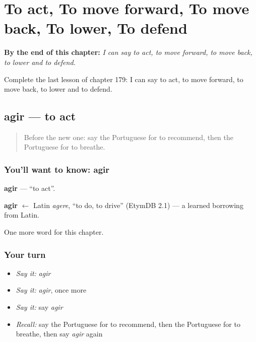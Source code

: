 
\chapter{To act, To move forward, To move back, To lower, To defend}
\label{ch:pt-to-act-to-move-forward-to-move-back-to-lower-to-defend}

\begin{chapteropening}
\textbf{By the end of this chapter:} \emph{I can say to act, to move forward, to move back, to lower and to defend.}

Complete the last lesson of chapter 179: I can say to act, to move forward, to move back, to lower and to defend.
\end{chapteropening}

\section[agir]{agir — to act}

\label{lesson:PT-C179-agir}



\begin{quote}
Before the new one: say the Portuguese for to recommend, then the Portuguese for to breathe.
\end{quote}

\subsection*{You'll want to know: agir}
\textbf{agir} — \textquotedblleft{}to act\textquotedblright{}.

\begin{cousinweb}
\textbf{agir} $\leftarrow$ Latin \emph{agere}, \textquotedblleft{}to do, to drive\textquotedblright{} (EtymDB 2.1) — a learned borrowing from Latin.
\end{cousinweb}

\begin{grammarlens}[title={What you've built}]
One more word for this chapter.
\end{grammarlens}

\subsection*{Your turn}
\begin{itemize}
\raggedright
  \item \emph{Say it:} \emph{agir}
  \item \emph{Say it:} \emph{agir}, once more
  \item \emph{Say it:} say \emph{agir}
  \item \emph{Recall:} say the Portuguese for to recommend, then the Portuguese for to breathe, then say \emph{agir} again
\end{itemize}

